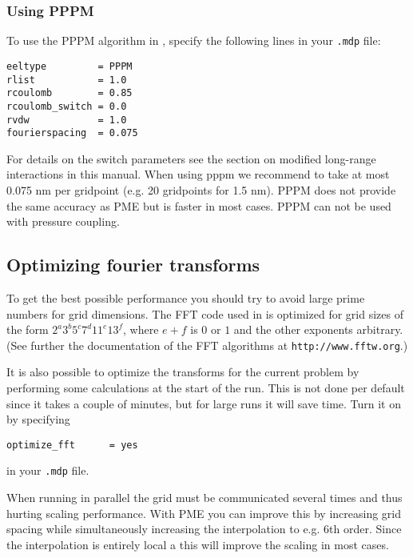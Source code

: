 \subsubsection{Using PPPM}
To use the PPPM algorithm in {\gromacs}, specify the
following lines in your {\tt .mdp} file:
\begin{verbatim}
eeltype         = PPPM
rlist           = 1.0
rcoulomb        = 0.85
rcoulomb_switch = 0.0
rvdw            = 1.0
fourierspacing  = 0.075
\end{verbatim}
For details on the switch parameters see the section on modified
long-range interactions in this manual. When using pppm we 
recommend to take at most 0.075 nm per gridpoint (e.g. 20 gridpoints for 1.5 nm).
PPPM does not provide the same accuracy as PME but is faster in most
cases. PPPM can not be used with pressure coupling.

\subsection{Optimizing fourier transforms}
To get the best possible performance you should try to avoid large
prime numbers for grid dimensions.
The FFT code used in {\gromacs} is
optimized for grid sizes of the form $2^a 3^b 5^c 7^d 11^e 13^f$,
where $e+f$ is $0$ or $1$ and the other exponents arbitrary. (See
further the documentation of the FFT algorithms at {\tt http://www.fftw.org}.)

It is also possible to optimize the transforms for the current problem
by performing some calculations at the start of the run. This is not
done per default since it takes a couple of minutes, but for large
runs it will save time. Turn it on by specifying

\begin{verbatim}
optimize_fft      = yes
\end{verbatim}
in your {\tt .mdp} file.

When running in parallel the grid must be communicated several times
and thus hurting scaling performance. With PME you can improve this
by increasing grid spacing while simultaneously increasing the
interpolation to e.g. 6th order. 
Since the interpolation is entirely local a this will
improve the scaling in most cases.

%
%
%
